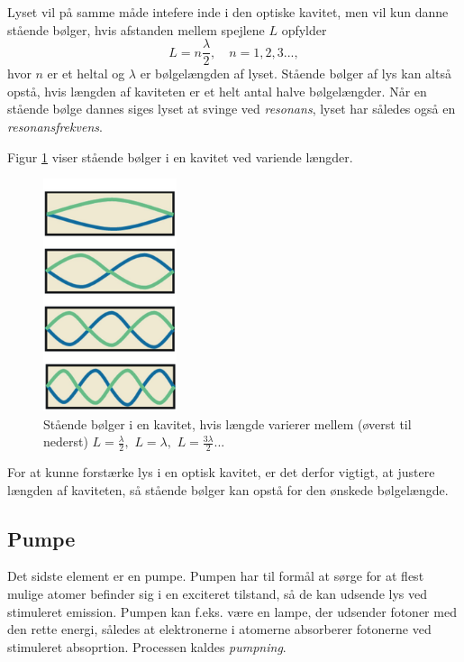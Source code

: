 Lyset vil på samme måde intefere inde i den optiske kavitet, men vil kun danne stående bølger, hvis afstanden mellem spejlene $L$ opfylder 
\begin{equation}
L = n\frac{\lambda}{2}, \,\,\,\,\,\, n =1,2,3...,
\end{equation}
hvor $n$ er et heltal og $\lambda$ er bølgelængden af lyset. Stående bølger af lys kan altså opstå, hvis længden af kaviteten er et helt antal halve bølgelængder. Når en stående bølge dannes siges lyset at svinge ved \emph{resonans}, lyset har således også en \emph{resonansfrekvens}. 

Figur \ref{fig:bolger} viser stående bølger i en kavitet ved variende længder. 

\begin{figure}[h!]
  \centering
  \includegraphics[width=0.35\textwidth]{Laserfysik/standing_waves_only.png}
  \caption{Stående bølger i en kavitet, hvis længde varierer mellem (øverst til nederst) $L = \frac{\lambda}{2}, \,\, L = \lambda, \,\, L = \frac{3\lambda}{2}...$}
  \label{fig:bolger}
\end{figure}

For at kunne forstærke lys i en optisk kavitet, er det derfor vigtigt, at justere længden af kaviteten, så stående bølger kan opstå for den ønskede bølgelængde.  

\subsection{Pumpe}
Det sidste element er en pumpe. Pumpen har til formål at sørge for at flest mulige atomer befinder sig i en exciteret tilstand, så de kan udsende lys ved stimuleret emission. Pumpen kan f.eks. være en lampe, der udsender fotoner med den rette energi, således at elektronerne i atomerne absorberer fotonerne ved stimuleret absoprtion. Processen kaldes \emph{pumpning}. 

